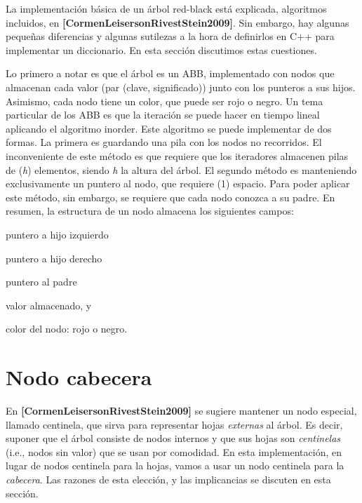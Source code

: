 La implementación básica de un árbol red-\/black está explicada, algoritmos incluidos, en {\bfseries [Cormen\+Leiserson\+Rivest\+Stein2009]}. Sin embargo, hay algunas pequeñas diferencias y algunas sutilezas a la hora de definirlos en C++ para implementar un diccionario. En esta sección discutimos estas cuestiones.

Lo primero a notar es que el árbol es un A\+BB, implementado con nodos que almacenan cada valor (par {\ttfamily (clave, significado)}) junto con los punteros a sus hijos. Asimismo, cada nodo tiene un color, que puede ser rojo o negro. Un tema particular de los A\+BB es que la iteración se puede hacer en tiempo lineal aplicando el algoritmo inorder. Este algoritmo se puede implementar de dos formas. La primera es guardando una pila con los nodos no recorridos. El inconveniente de este método es que requiere que los iteradores almacenen pilas de ({\itshape h}) elementos, siendo {\itshape h} la altura del árbol. El segundo método es manteniendo exclusivamente un puntero al nodo, que requiere (1) espacio. Para poder aplicar este método, sin embargo, se requiere que cada nodo conozca a su padre. En resumen, la estructura de un nodo almacena los siguientes campos\+:
\begin{DoxyItemize}
\item puntero a hijo izquierdo
\item puntero a hijo derecho
\item puntero al padre
\item valor almacenado, y
\item color del nodo\+: rojo o negro.
\end{DoxyItemize}\hypertarget{Implementacion_Cabecera}{}\section{Nodo cabecera}\label{Implementacion_Cabecera}
En {\bfseries [Cormen\+Leiserson\+Rivest\+Stein2009]} se sugiere mantener un nodo especial, llamado centinela, que sirva para representar hojas {\itshape externas} al árbol. Es decir, suponer que el árbol consiste de nodos internos y que sus hojas son {\itshape centinelas} (i.\+e., nodos sin valor) que se usan por comodidad. En esta implementación, en lugar de nodos centinela para la hojas, vamos a usar un nodo centinela para la {\itshape cabecera}. Las razones de esta elección, y las implicancias se discuten en esta sección.

